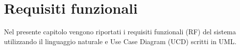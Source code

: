 \section{Requisiti funzionali}
\label{secD2:RequisitiFunzionali}

Nel presente capitolo vengono riportati i requisiti funzionali (RF) del sistema utilizzando il linguaggio naturale e Use Case Diagram (UCD) scritti in UML.